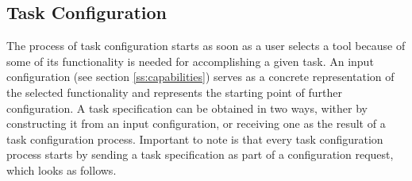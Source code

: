 \documentclass{article}
\begin{document}

  \subsection{Task Configuration} \label{ss:task_configuration}


   The process of task configuration starts as soon as a user selects a tool
   because of some of its functionality is needed for accomplishing a given
   task. An input configuration (see section \ref{ss:capabilities}) serves as a
   concrete representation of the selected functionality and represents the
   starting point of further configuration. A task specification can be
   obtained in two ways, wither by constructing it from an input configuration,
   or receiving one as the result of a task configuration process. Important to
   note is that every task configuration process starts by sending a task
   specification as part of a configuration request, which looks as follows.

   
\end{document}
